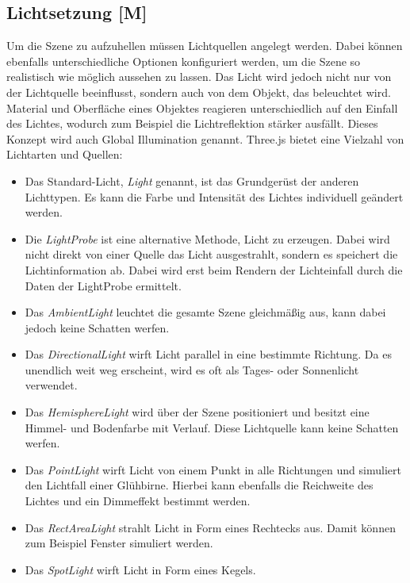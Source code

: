 \subsection{Lichtsetzung [M]}
\label{lichtsetzung}
Um die Szene zu aufzuhellen müssen Lichtquellen angelegt werden. Dabei können ebenfalls unterschiedliche Optionen konfiguriert werden, um die Szene so realistisch wie möglich aussehen zu lassen. Das Licht wird jedoch nicht nur von der Lichtquelle beeinflusst, sondern auch von dem Objekt, das beleuchtet wird. Material und Oberfläche eines Objektes reagieren unterschiedlich auf den Einfall des Lichtes, wodurch zum Beispiel die Lichtreflektion stärker ausfällt. Dieses Konzept wird auch Global Illumination genannt. Three.js bietet eine Vielzahl von Lichtarten und Quellen:

\begin{itemize}
    \item Das Standard-Licht, \emph{Light} genannt, ist das Grundgerüst der anderen Lichttypen. Es kann die Farbe und Intensität des Lichtes individuell geändert werden. \cite{StandardLight}
    \item Die \emph{LightProbe} ist eine alternative Methode, Licht zu erzeugen. Dabei wird nicht direkt von einer Quelle das Licht ausgestrahlt, sondern es speichert die Lichtinformation ab. Dabei wird erst beim Rendern der Lichteinfall durch die Daten der LightProbe ermittelt.  \cite{LightProbe}
    \item Das \emph{AmbientLight} leuchtet die gesamte Szene gleichmäßig aus, kann dabei jedoch keine Schatten werfen. \cite{AmbientLight}
    \item Das \emph{DirectionalLight} wirft Licht parallel in eine bestimmte Richtung. Da es unendlich weit weg erscheint, wird es oft als Tages- oder Sonnenlicht verwendet. \cite{DirectionalLight}
    \item Das \emph{HemisphereLight} wird über der Szene positioniert und besitzt eine Himmel- und Bodenfarbe mit Verlauf. Diese Lichtquelle kann keine Schatten werfen. \cite{HemisphereLight}
    \item Das \emph{PointLight} wirft Licht von einem Punkt in alle Richtungen und simuliert den Lichtfall einer Glühbirne. Hierbei kann ebenfalls die Reichweite des Lichtes und ein Dimmeffekt bestimmt werden. \cite{PointLight}
    \item Das \emph{RectAreaLight} strahlt Licht in Form eines Rechtecks aus. Damit können zum Beispiel Fenster simuliert werden. \cite{ReactAreaLight}
    \item Das \emph{SpotLight} wirft Licht in Form eines Kegels. \cite{SpotLight}
\end{itemize}

